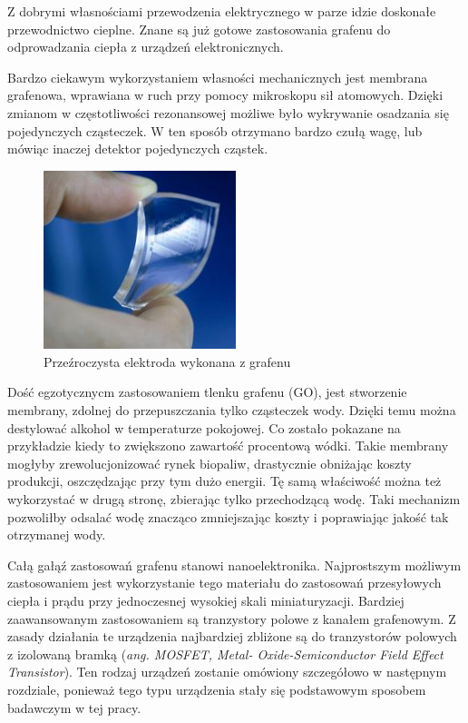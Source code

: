 	Z dobrymi własnościami przewodzenia elektrycznego w parze idzie doskonałe przewodnictwo cieplne. Znane są już
	gotowe zastosowania grafenu do odprowadzania ciepła z urządzeń elektronicznych.

	Bardzo ciekawym wykorzystaniem własności mechanicznych jest membrana grafenowa, wprawiana w ruch przy pomocy
	mikroskopu sił atomowych. Dzięki zmianom w częstotliwości rezonansowej możliwe było wykrywanie osadzania się 
	pojedynczych cząsteczek. W ten sposób otrzymano bardzo czułą wagę, lub mówiąc inaczej detektor pojedynczych cząstek.
	
	
	\begin{figure}[ht]
	\centering
	\includegraphics[width=0.5\textwidth]{./Rozdzial_2/obrazki/elektroda.png}
	\caption{Przeźroczysta elektroda wykonana z grafenu}
	\label{fig:elektroda}
	\end{figure}		
		
	Dość egzotycznycm zastosowaniem tlenku grafenu (GO), jest stworzenie membrany, zdolnej do przepuszczania tylko 
	cząsteczek wody. Dzięki temu można destylować alkohol w temperaturze pokojowej. Co zostało pokazane na przykładzie
	kiedy to zwiększono zawartość procentową wódki. Takie membrany mogłyby zrewolucjonizować rynek biopaliw, 
	drastycznie obniżając koszty produkcji, oszczędzając przy tym dużo energii.
	Tę samą właściwość można też wykorzystać w drugą stronę, zbierając tylko przechodzącą wodę. Taki mechanizm 
	pozwoliłby odsalać wodę znacząco zmniejszając koszty i poprawiając jakość tak otrzymanej wody.

	Całą gałąź zastosowań grafenu stanowi nanoelektronika. Najprostszym możliwym zastosowaniem jest wykorzystanie 
	tego materiału do zastosowań przesyłowych ciepła i prądu przy jednoczesnej wysokiej skali miniaturyzacji.
	Bardziej zaawansowanym zastosowaniem są tranzystory polowe z kanałem grafenowym. Z zasady działania
	te urządzenia najbardziej zbliżone są do tranzystorów polowych z izolowaną bramką (\textit{ang. MOSFET, Metal-
	Oxide-Semiconductor Field Effect Transistor}). Ten rodzaj urządzeń zostanie omówiony szczegółowo w następnym
	rozdziale, ponieważ tego typu urządzenia stały się podstawowym sposobem badawczym w tej pracy.


